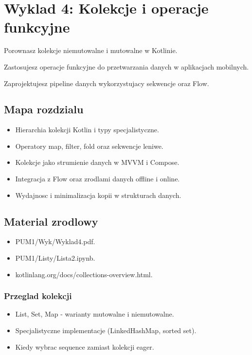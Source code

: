 \chapter{Wyklad 4: Kolekcje i operacje funkcyjne}

\begin{learningobjectives}
  \item Porownasz kolekcje niemutowalne i mutowalne w Kotlinie.
  \item Zastosujesz operacje funkcyjne do przetwarzania danych w aplikacjach mobilnych.
  \item Zaprojektujesz pipeline danych wykorzystujacy sekwencje oraz Flow.
\end{learningobjectives}

\section{Mapa rozdzialu}
\begin{itemize}
  \item Hierarchia kolekcji Kotlin i typy specjalistyczne.
  \item Operatory map, filter, fold oraz sekwencje leniwe.
  \item Kolekcje jako strumienie danych w MVVM i Compose.
  \item Integracja z Flow oraz zrodlami danych offline i online.
  \item Wydajnosc i minimalizacja kopii w strukturach danych.
\end{itemize}

\section{Material zrodlowy}
\begin{itemize}
  \item PUM1/Wyk/Wyklad4.pdf.
  \item PUM1/Listy/Lista2.ipynb.
  \item kotlinlang.org/docs/collections-overview.html.
\end{itemize}

\subsection{Przeglad kolekcji}
\begin{itemize}
  \item List, Set, Map - warianty mutowalne i niemutowalne.
  \item Specjalistyczne implementacje (LinkedHashMap, sorted set).
  \item Kiedy wybrac sequence zamiast kolekcji eager.
\end{itemize}

